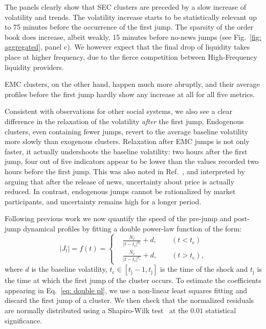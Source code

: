 \documentclass[amsmath,amssymb,aps,pre,floatfix,twocolumn,superscriptaddress]{revtex4}
\begin{document}
The panels clearly show that SEC clusters are preceded by a slow  increase of volatility and trends. The volatility increase starts to be statistically relevant up to 75 minutes before the occurrence of the first jump. The sparsity of the order book does increase, albeit weakly, 15 minutes before no-news jumps (see Fig.~\ref{fig: aggregated}, panel c). We however expect that the final drop of liquidity takes place at higher frequency, due to the fierce competition between High-Frequency liquidity providers. 

EMC clusters, on the other hand, happen much more abruptly, and their average profiles before the first jump hardly show any increase at all for all five metrics. 

Consistent with observations for other social systems, we also see a clear difference in the relaxation of the volatility {\it after} the first jump. Endogenous clusters, even containing fewer jumps, revert to the average baseline volatility more slowly than exogenous clusters. Relaxation after EMC jumps is not only faster, it actually undershoots the baseline volatility: two hours after the first jump, four out of five indicators appear to be lower than the values recorded two hours before the first jump. This was also noted in Ref.~\cite{vol_news_jp}, and interpreted by arguing that after the release of news, uncertainty about price is actually reduced. In contrast, endogenous jumps cannot be rationalized by market participants, and uncertainty remains high for a longer period.

Following previous work \cite{sornette_youtube, sornette_book_critical, lillo_mantegna_pl,zawadowski2006short,pl_relax_2, vol_news_jp} we now quantify the speed of the pre-jump and post-jump dynamical profiles by fitting a double power-law function of the form:
\begin{equation}\label{eq: double pl}
\vert J_t\vert= f(t) =
\begin{cases}
&\frac{N_\ell}{\vert t-t_{\text{c}} \vert^{p_\ell}} + d, \qquad (t < t_{\text{c}}) 
\\
&\frac{N_r}{\vert t-t_{\text{c}} \vert^{p_r}} + d, \qquad (t > t_{\text{c}}),
\end{cases}
\end{equation}
where $d$ is the baseline volatility, $t_{\text{c}} \in [t_{\text{j}}-1,t_{\text{j}}]$ is the time of the shock and $t_{\text{j}}$ is the time at which the first jump of the cluster occurs. To estimate the coefficients appearing in Eq.~\eqref{eq: double pl}, we use a non-linear least squares fitting and discard the first jump of a cluster. We then check that the normalized residuals are normally distributed using a Shapiro-Wilk test~\cite{shapiro1965analysis} at the $0.01$ statistical significance.
\end{document}
